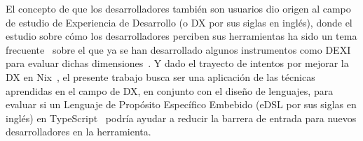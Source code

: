 El concepto de que los desarrolladores también son usuarios dio origen al campo de estudio de Experiencia de Desarrollo (o DX por sus siglas en inglés), donde el estudio sobre cómo los desarrolladores perciben sus herramientas ha sido un tema frecuente~\cite{Razzaq2024} sobre el que ya se han desarrollado algunos instrumentos como DEXI para evaluar dichas dimensiones~\cite{Kuusinen2016}. Y dado el trayecto de intentos por mejorar la DX en Nix~\cite{caddetNixNickel,gagarinFourMonthsNix,hufschmittCurrentStatePtyx,fricklerhandwerk2022}, el presente trabajo busca ser una aplicación de las técnicas aprendidas en el campo de DX, en conjunto con el diseño de lenguajes, para evaluar si un Lenguaje de Propósito Específico Embebido (eDSL por sus siglas en inglés) en TypeScript~\cite{Typescript} podría ayudar a reducir la barrera de entrada para nuevos desarrolladores en la herramienta.
